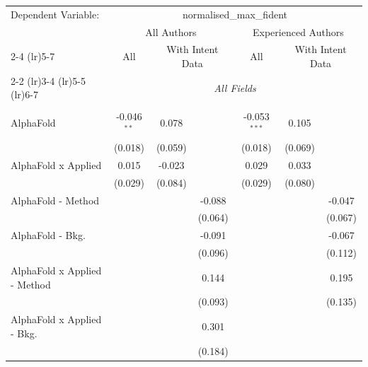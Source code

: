 \begingroup
\centering
\begin{tabular}{lcccccc}
   \tabularnewline \midrule \midrule
   Dependent Variable: & \multicolumn{6}{c}{normalised\_max\_fident}\\
 & \multicolumn{3}{c}{All Authors} & \multicolumn{3}{c}{Experienced Authors} \\
\cmidrule(lr){2-4} \cmidrule(lr){5-7}
 & \multicolumn{1}{c}{All} & \multicolumn{2}{c}{With Intent Data} & \multicolumn{1}{c}{All} & \multicolumn{2}{c}{With Intent Data} \\
\cmidrule(lr){2-2} \cmidrule(lr){3-4} \cmidrule(lr){5-5} \cmidrule(lr){6-7}
 & \multicolumn{6}{c}{\textit{All Fields}} \\ \\
   AlphaFold                      & -0.046$^{**}$ & 0.078        &         & -0.053$^{***}$ & 0.105        &   \\   
                                  & (0.018)       & (0.059)      &         & (0.018)        & (0.069)      &   \\   
   AlphaFold x Applied            & 0.015         & -0.023       &         & 0.029          & 0.033        &   \\   
                                  & (0.029)       & (0.084)      &         & (0.029)        & (0.080)      &   \\   
   AlphaFold - Method             &               &              & -0.088  &                &              & -0.047\\   
                                  &               &              & (0.064) &                &              & (0.067)\\   
   AlphaFold - Bkg.               &               &              & -0.091  &                &              & -0.067\\   
                                  &               &              & (0.096) &                &              & (0.112)\\   
   AlphaFold x Applied - Method   &               &              & 0.144   &                &              & 0.195\\   
                                  &               &              & (0.093) &                &              & (0.135)\\   
   AlphaFold x Applied - Bkg.     &               &              & 0.301   &                &              &   \\   
                                  &               &              & (0.184) &                &              &   \\   

\end{tabular}
